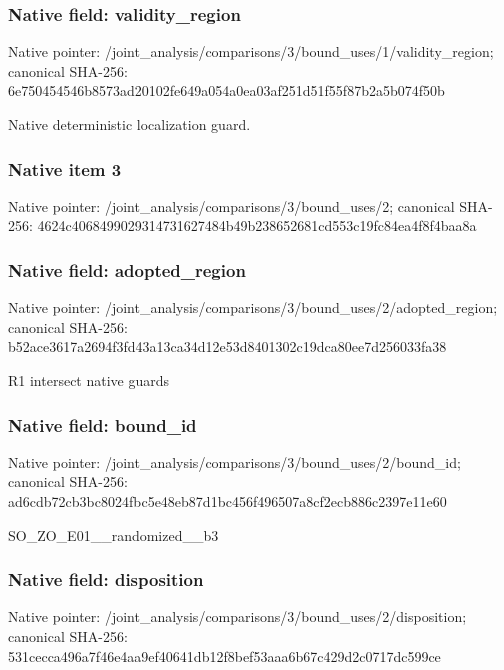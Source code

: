 \documentclass[10pt,a4paper]{article}
\begin{document}
\subsubsection{Native field: validity\_\allowbreak{}region}
Native pointer: /joint\_\allowbreak{}analysis/comparisons/3/bound\_\allowbreak{}uses/1/validity\_\allowbreak{}region; canonical SHA-256: 6e750454546b8573ad20102fe649a054a0ea03af251d51f55f87b2a5b074f50b

\begingroup\raggedright\sloppy Native deterministic localization guard.\par\endgroup

\subsubsection{Native item 3}
Native pointer: /joint\_\allowbreak{}analysis/comparisons/3/bound\_\allowbreak{}uses/2; canonical SHA-256: 4624c4068499029314731627484b49b238652681cd553c19fc84ea4f8f4baa8a

\subsubsection{Native field: adopted\_\allowbreak{}region}
Native pointer: /joint\_\allowbreak{}analysis/comparisons/3/bound\_\allowbreak{}uses/2/adopted\_\allowbreak{}region; canonical SHA-256: b52ace3617a2694f3fd43a13ca34d12e53d8401302c19dca80ee7d256033fa38

\begingroup\raggedright\sloppy R1 intersect native guards\par\endgroup

\subsubsection{Native field: bound\_\allowbreak{}id}
Native pointer: /joint\_\allowbreak{}analysis/comparisons/3/bound\_\allowbreak{}uses/2/bound\_\allowbreak{}id; canonical SHA-256: ad6cdb72cb3bc8024fbc5e48eb87d1bc456f496507a8cf2ecb886c2397e11e60

\begingroup\raggedright\sloppy SO\_\allowbreak{}ZO\_\allowbreak{}E01\_\allowbreak{}\_\allowbreak{}randomized\_\allowbreak{}\_\allowbreak{}b3\par\endgroup

\subsubsection{Native field: disposition}
Native pointer: /joint\_\allowbreak{}analysis/comparisons/3/bound\_\allowbreak{}uses/2/disposition; canonical SHA-256: 531cecca496a7f46e4aa9ef40641db12f8bef53aaa6b67c429d2c0717dc599ce
\end{document}
